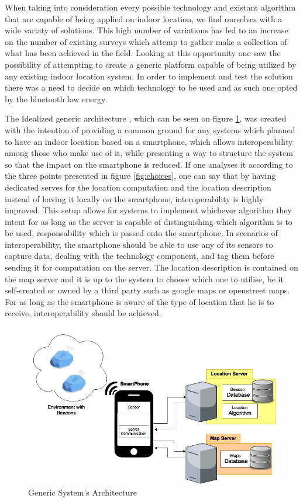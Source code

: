 \documentclass[a4paper]{IEEEtran}
\begin{document}
When taking into consideration every possible technology and existant algorithm that are capable of being applied on indoor location, we find ourselves with a wide variaty of solutions. This high number of variations has led to an increase on the number of existing surveys which attemp to gather make a collection of what has been achieved in the field. Looking at this opportunity one saw the possibility of attempting to create a generic platform capable of being utilized by any existing indoor location system. In order to implement and test the solution there was a need to decide on which technology to be used and as such one opted by the bluetooth low energy.

The Idealized generic architecture , which can be seen on figure \ref{fig:generic}, was created with the intention of providing a common ground for any systems which planned to have an indoor location based on a smartphone, which allows interoperability among those who make use of it, while presenting a way to structure the system so that the impact on the smartphone is reduced. If one analyses it according to the three points presented in figure \ref{fig:choices}, one can say that by having dedicated serves for the location computation and the location description instead of having it locally on the smartphone, interoperability is highly improved. This setup allows for systems to implement whichever algorithm they intent for as long as the server is capable of distinguishing which algorithm is to be used, responsability which is passed onto the smartphone. In scenarios of interoperability, the smartphone should be able to use any of its sensors to capture data, dealing with the technology component, and tag them before sending it for computation on the server. The location description is contained on the map server and it is up to the system to choose which one to utilise, be it self-created or owned by a third party such as google maps or openstreet maps. For as long as the smartphone is aware of the type of location that he is to receive, interoperability should be achieved.

\begin{figure}
	\centering
		\includegraphics[width=1\linewidth]{figures/generic.png}
	\caption[Generic System's Architecture]{Generic System's Architecture}
	\label{fig:generic}
\end{figure}
\end{document}
